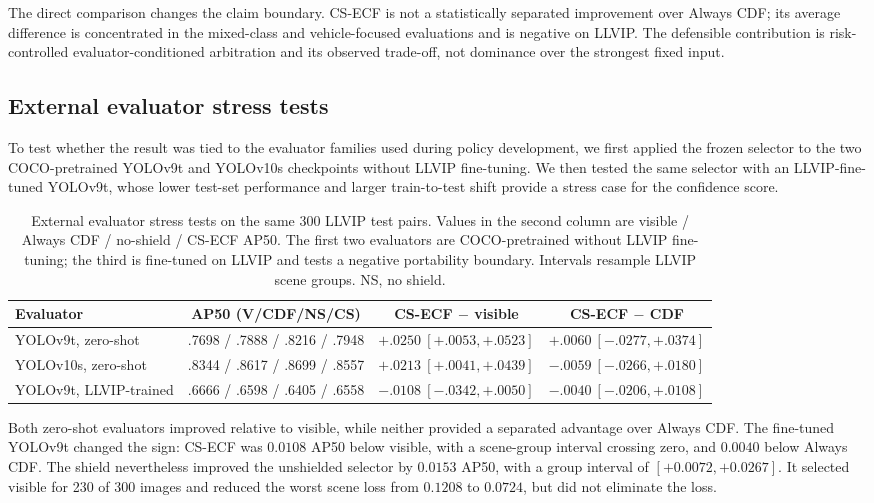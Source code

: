 \documentclass[preprint,11pt]{elsarticle}
\begin{document}
The direct comparison changes the claim boundary. CS-ECF is not a statistically
separated improvement over Always CDF; its average difference is concentrated
in the mixed-class and vehicle-focused evaluations and is negative on LLVIP.
The defensible contribution is risk-controlled evaluator-conditioned
arbitration and its observed trade-off, not dominance over the strongest fixed
input.

\subsection{External evaluator stress tests}

To test whether the result was tied to the evaluator families used during
policy development, we first applied the frozen selector to the two
COCO-pretrained YOLOv9t and YOLOv10s checkpoints without LLVIP fine-tuning.
We then tested the same selector with an LLVIP-fine-tuned YOLOv9t, whose lower
test-set performance and larger train-to-test shift provide a stress case for
the confidence score.

\begin{table}[t]
\centering
\scriptsize
\setlength{\tabcolsep}{3pt}
\caption{External evaluator stress tests on the same 300 LLVIP test pairs.
Values in the second column are visible / Always CDF / no-shield / CS-ECF AP50.
The first two evaluators are COCO-pretrained without LLVIP fine-tuning; the
third is fine-tuned on LLVIP and tests a negative portability boundary.
Intervals resample LLVIP scene groups. NS, no shield.}
\label{tab:independent}
\begin{tabular}{@{}lccc@{}}
\toprule
Evaluator & AP50 (V/CDF/NS/CS) &
CS-ECF \(-\) visible & CS-ECF \(-\) CDF \\
\midrule
YOLOv9t, zero-shot & .7698 / .7888 / .8216 / .7948 &
\(+.0250~[+.0053,+.0523]\) & \(+.0060~[-.0277,+.0374]\) \\
YOLOv10s, zero-shot & .8344 / .8617 / .8699 / .8557 &
\(+.0213~[+.0041,+.0439]\) & \(-.0059~[-.0266,+.0180]\) \\
YOLOv9t, LLVIP-trained & .6666 / .6598 / .6405 / .6558 &
\(-.0108~[-.0342,+.0050]\) & \(-.0040~[-.0206,+.0108]\) \\
\bottomrule
\end{tabular}
\end{table}

Both zero-shot evaluators improved relative to visible, while neither provided
a separated advantage over Always CDF. The fine-tuned YOLOv9t changed the sign:
CS-ECF was \(0.0108\) AP50 below visible, with a scene-group interval crossing
zero, and \(0.0040\) below Always CDF. The shield nevertheless improved the
unshielded selector by \(0.0153\) AP50, with a group interval of
\([+0.0072,+0.0267]\). It selected visible for 230 of 300 images and reduced
the worst scene loss from \(0.1208\) to \(0.0724\), but did not eliminate the
loss.
\end{document}
